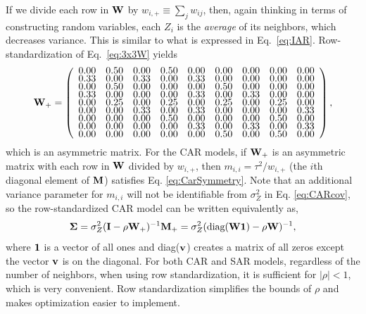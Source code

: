 \documentclass[11pt, titlepage]{article}\usepackage[]{graphicx}\usepackage[]{color}
\begin{document}
\begin{spacing}{1.9}
\begin{flushleft}
If we divide each row in $\mathbf{W}$ by $w_{i,+} \equiv \sum_j w_{ij}$, then, again thinking in terms of constructing random variables, each $Z_i$ is the \textit{average} of its neighbors, which decreases variance. This is similar to what is expressed in Eq.~\ref{eq:IAR}. Row-standardization of Eq.~\ref{eq:3x3W} yields
\begin{equation} \label{eq:W9plus}
\renewcommand\arraystretch{.5}
\bW_+ = \left(
\begin{array}{ccccccccc}
 0.00 & 0.50 & 0.00 & 0.50 & 0.00 & 0.00 & 0.00 & 0.00 & 0.00 \\ 
  0.33 & 0.00 & 0.33 & 0.00 & 0.33 & 0.00 & 0.00 & 0.00 & 0.00 \\ 
  0.00 & 0.50 & 0.00 & 0.00 & 0.00 & 0.50 & 0.00 & 0.00 & 0.00 \\ 
  0.33 & 0.00 & 0.00 & 0.00 & 0.33 & 0.00 & 0.33 & 0.00 & 0.00 \\ 
  0.00 & 0.25 & 0.00 & 0.25 & 0.00 & 0.25 & 0.00 & 0.25 & 0.00 \\ 
  0.00 & 0.00 & 0.33 & 0.00 & 0.33 & 0.00 & 0.00 & 0.00 & 0.33 \\ 
  0.00 & 0.00 & 0.00 & 0.50 & 0.00 & 0.00 & 0.00 & 0.50 & 0.00 \\ 
  0.00 & 0.00 & 0.00 & 0.00 & 0.33 & 0.00 & 0.33 & 0.00 & 0.33 \\ 
  0.00 & 0.00 & 0.00 & 0.00 & 0.00 & 0.50 & 0.00 & 0.50 & 0.00 \\ 
  
\end{array}
\right),
\end{equation}
which is an asymmetric matrix. For the CAR models, if $\mathbf{W}_+$ is an asymmetric matrix with each row in $\mathbf{W}$ divided by $w_{i,+}$, then $m_{i,i} = \tau^2/w_{i,+}$ (the $i$th diagonal element of $\mathbf{M}$) satisfies Eq. \ref{eq:CarSymmetry}. Note that an additional variance parameter for $m_{i,i}$ will not be identifiable from $\sigma_Z^2$ in Eq. \ref{eq:CARcov}, so the row-standardized CAR model can be written equivalently as,
\begin{equation}\label{eq:bWone}
  \mbox{\boldmath $\Sigma$} = \sigma_Z^2(\mathbf{I} - \rho\mathbf{W}_+)^{-1}\mathbf{M}_+= \sigma_Z^2(\textrm{diag}(\mathbf{W}\mathbf{1}) - \rho\mathbf{W})^{-1},
\end{equation}
where $\mathbf{1}$ is a vector of all ones and diag($\mathbf{v}$) creates a matrix of all zeros except the vector $\mathbf{v}$ is on the diagonal. For both CAR and SAR models, regardless of the number of neighbors, when using row standardization, it is sufficient for $|\rho| < 1$, which is very convenient. Row standardization simplifies the bounds of $\rho$ and makes optimization easier to implement.  


\end{flushleft}
\end{spacing}
\end{document}
